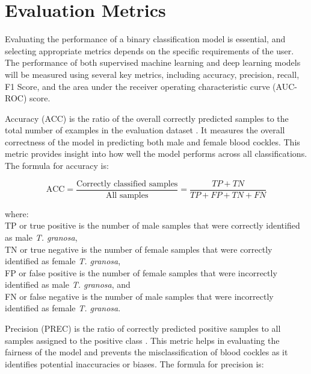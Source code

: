 \section{Evaluation Metrics}
Evaluating the performance of a binary classification model is essential, and selecting appropriate metrics depends on the specific requirements of the user. The performance of both supervised machine learning and deep learning models will be measured using several key metrics, including accuracy, precision, recall, F1 Score, and the area under the receiver operating characteristic curve (AUC-ROC) score.

Accuracy (ACC) is the ratio of the overall correctly predicted samples to the total number of examples in the evaluation dataset \cite{cui2020}. It measures the overall correctness of the model in predicting both male and female blood cockles. This metric provides insight into how well the model performs across all classifications. The formula for accuracy is: 

\begin{equation}
	\text{ACC} = \frac{\text{Correctly classified samples}}{\text{All samples}} = \frac{TP + TN}{TP + FP + TN + FN}
	\label{eq:acc}
\end{equation}

\hspace*{2em}where: \\
\hspace*{2em}TP or true positive is the number of male samples that were correctly identified as male \textit{T. granosa}, \\
\hspace*{2em}TN or true negative is the number of female samples that were correctly identified as female \textit{T. granosa}, \\
\hspace*{2em}FP or false positive is the number of female samples that were incorrectly identified as male \textit{T. granosa}, and \\
\hspace*{2em}FN or false negative is the number of male samples that were incorrectly identified as female \textit{T. granosa}.


Precision (PREC) is the ratio of correctly predicted positive samples to all samples assigned to the positive class \cite{cui2020}. This metric helps in evaluating the fairness of the model and prevents the misclassification of blood cockles as it identifies potential inaccuracies or biases. The formula for precision is:


